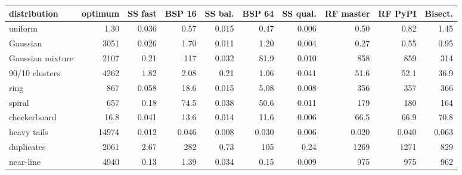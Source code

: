 \begin{tabular}{lrrrrrrrrr}
\toprule
distribution & optimum & SS fast & BSP 16 & SS bal. & BSP 64 & SS qual. & RF master & RF PyPI & Bisect. \\
\midrule
uniform & 1.30 & 0.036 & 0.57 & 0.015 & 0.47 & 0.006 & 0.50 & 0.82 & 1.45 \\
Gaussian & 3051 & 0.026 & 1.70 & 0.011 & 1.20 & 0.004 & 0.27 & 0.55 & 0.95 \\
Gaussian mixture & 2107 & 0.21 & 117 & 0.032 & 81.9 & 0.010 & 858 & 859 & 314 \\
90/10 clusters & 4262 & 1.82 & 2.08 & 0.21 & 1.06 & 0.041 & 51.6 & 52.1 & 36.9 \\
ring & 867 & 0.058 & 18.6 & 0.015 & 5.08 & 0.008 & 356 & 357 & 366 \\
spiral & 657 & 0.18 & 74.5 & 0.038 & 50.6 & 0.011 & 179 & 180 & 164 \\
checkerboard & 16.8 & 0.041 & 13.6 & 0.014 & 11.6 & 0.006 & 66.5 & 66.9 & 70.8 \\
heavy tails & 14974 & 0.012 & 0.046 & 0.008 & 0.030 & 0.006 & 0.020 & 0.040 & 0.063 \\
duplicates & 2061 & 2.67 & 282 & 0.73 & 105 & 0.24 & 1269 & 1271 & 829 \\
near-line & 4940 & 0.13 & 1.39 & 0.034 & 0.15 & 0.009 & 975 & 975 & 962 \\
\bottomrule
\end{tabular}
